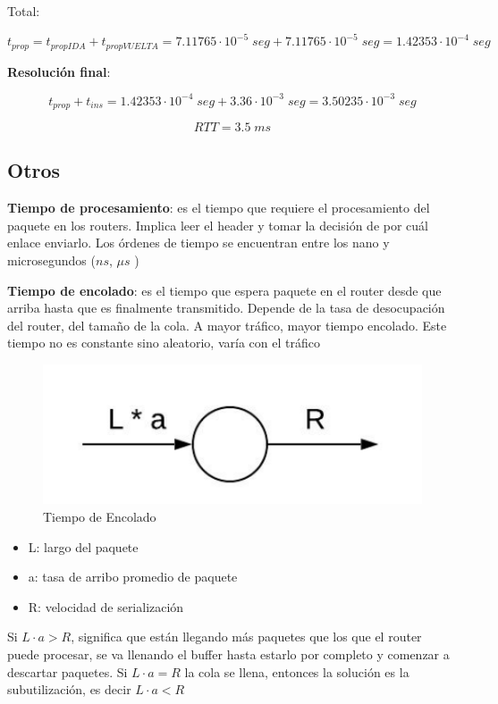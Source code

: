 \documentclass[titlepage,a4paper]{article}
\begin{document}
Total:

$$t_{prop} = t_{propIDA} + t_{propVUELTA}  =  7.11765 \cdot 10^{-5} \; seg + 7.11765 \cdot 10^{-5} \; seg = 1.42353\cdot10^{-4} \; seg$$

\textbf{Resolución final}:

$$ t_{prop} + t_{ins} = 1.42353\cdot10^{-4} \; seg + 3.36 \cdot 10^{-3} \; seg = 3.50235 \cdot 10^{-3} \; seg$$

$$ RTT = 3.5 \; ms$$


\subsection{Otros}

\textbf{Tiempo de procesamiento}: es el tiempo que requiere el procesamiento del paquete en los routers. Implica leer el header y tomar la decisión de por cuál enlace enviarlo. Los órdenes de tiempo se encuentran entre los nano y microsegundos ($ns$, $\mu s$ )

\textbf{Tiempo de encolado}: es el tiempo que espera paquete en el router desde que arriba hasta que es finalmente transmitido. Depende de la tasa de desocupación del router, del tamaño de la cola. A mayor tráfico, mayor tiempo encolado. Este tiempo no es constante sino aleatorio, varía con el tráfico

\begin{figure}[H]
\centering
\includegraphics[width=\textwidth]{tiempoEncolado.png}
\caption{Tiempo de Encolado}
\end{figure}

\begin{itemize}
    \item L: largo del paquete
    \item a: tasa de arribo promedio de paquete
    \item R: velocidad de serialización
\end{itemize}

Si $L \cdot a > R$, significa que están llegando más paquetes que los que el router puede procesar, se va llenando el buffer hasta estarlo por completo y comenzar a descartar paquetes. Si $L \cdot a = R$ la cola se llena, entonces la solución es la subutilización, es decir $L \cdot a < R$
\end{document}
